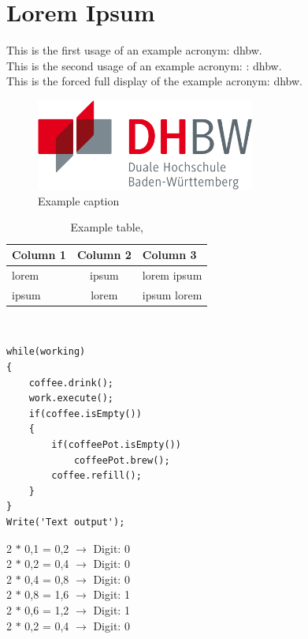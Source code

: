 \chapter{Lorem Ipsum}\label{ch:lorem-ipsum}
This is the first usage of an example acronym: \ac{dhbw}.\\
This is the second usage of an example acronym: : \ac{dhbw}.\\
This is the forced full display of the example acronym: \acf{dhbw}.

\begin{figure}[h]
    \centering
    \includegraphics[height=3cm]{images/dhbw}
    \caption{Example caption}\label{fig:figure}
\end{figure}


\begin{table}[htbp]         %
    \begin{tabular}{lcl}        %
        \hline                  %
        \textbf{Column 1} & \textbf{Column 2} & \textbf{Column 3} \\
        \hline
        lorem             & ipsum             & lorem ipsum       \\
        ipsum             & lorem             & ipsum lorem
    \end{tabular}~\caption{Example table, \cite{lorem}}
    \label{tab:table1}
\end{table}


\newpage
\begin{lstlisting}[caption=This is a code listing,label=lst:code]
while(working)
{
    coffee.drink();
    work.execute();
    if(coffee.isEmpty())
    {
        if(coffeePot.isEmpty())
            coffeePot.brew();
        coffee.refill();
    }
}
Write('Text output');
\end{lstlisting}


\begin{center}
    2 $\ast$ 0,1 = 0,2 $\rightarrow$ Digit: 0 \\
    2 $\ast$ 0,2 = 0,4 $\rightarrow$ Digit: 0 \\
    2 $\ast$ 0,4 = 0,8 $\rightarrow$ Digit: 0 \\
    2 $\ast$ 0,8 = 1,6 $\rightarrow$ Digit: 1 \\
    2 $\ast$ 0,6 = 1,2 $\rightarrow$ Digit: 1 \\
    2 $\ast$ 0,2 = 0,4 $\rightarrow$ Digit: 0 \\
\end{center}


